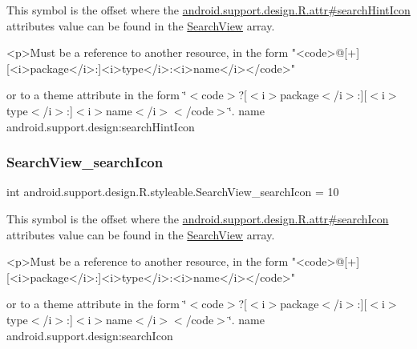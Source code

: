 This symbol is the offset where the \hyperlink{classandroid_1_1support_1_1design_1_1R_1_1attr_a5db56ee02e5f7a0494a2e099b6d10644}{android.\+support.\+design.\+R.\+attr\#search\+Hint\+Icon} attribute\textquotesingle{}s value can be found in the \hyperlink{classandroid_1_1support_1_1design_1_1R_1_1styleable_a8f7e72dc1bf854e14c1be7dbc1cb7392}{Search\+View} array.

\begin{DoxyVerb}      <p>Must be a reference to another resource, in the form "<code>@[+][<i>package</i>:]<i>type</i>:<i>name</i></code>"
\end{DoxyVerb}
 or to a theme attribute in the form \char`\"{}$<$code$>$?\mbox{[}$<$i$>$package$<$/i$>$\+:\mbox{]}\mbox{[}$<$i$>$type$<$/i$>$\+:\mbox{]}$<$i$>$name$<$/i$>$$<$/code$>$\char`\"{}.  name android.\+support.\+design\+:search\+Hint\+Icon \mbox{\label{classandroid_1_1support_1_1design_1_1R_1_1styleable_a4261289fdaf3e932d53a3c70b119b5bf}} 
\subsubsection{\texorpdfstring{Search\+View\+\_\+search\+Icon}{SearchView\_searchIcon}}
{\footnotesize\ttfamily int android.\+support.\+design.\+R.\+styleable.\+Search\+View\+\_\+search\+Icon = 10\hspace{0.3cm}{\ttfamily [static]}}

This symbol is the offset where the \hyperlink{classandroid_1_1support_1_1design_1_1R_1_1attr_a086a4c10a5ff7204fc9c9035a77d0c50}{android.\+support.\+design.\+R.\+attr\#search\+Icon} attribute\textquotesingle{}s value can be found in the \hyperlink{classandroid_1_1support_1_1design_1_1R_1_1styleable_a8f7e72dc1bf854e14c1be7dbc1cb7392}{Search\+View} array.

\begin{DoxyVerb}      <p>Must be a reference to another resource, in the form "<code>@[+][<i>package</i>:]<i>type</i>:<i>name</i></code>"
\end{DoxyVerb}
 or to a theme attribute in the form \char`\"{}$<$code$>$?\mbox{[}$<$i$>$package$<$/i$>$\+:\mbox{]}\mbox{[}$<$i$>$type$<$/i$>$\+:\mbox{]}$<$i$>$name$<$/i$>$$<$/code$>$\char`\"{}.  name android.\+support.\+design\+:search\+Icon \mbox{\label{classandroid_1_1support_1_1design_1_1R_1_1styleable_accdf4bff313010f9ca3ee8384626b8cb}} 
